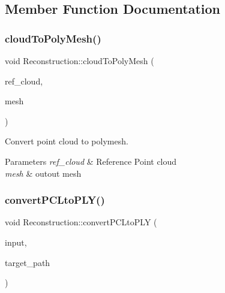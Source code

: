 \subsection{Member Function Documentation}
\mbox{\label{classReconstruction_a1b7f0942d1540ace69e53c28d3b82023}} 
\subsubsection{\texorpdfstring{cloud\+To\+Poly\+Mesh()}{cloudToPolyMesh()}}
{\footnotesize\ttfamily void Reconstruction\+::cloud\+To\+Poly\+Mesh (\begin{DoxyParamCaption}\item[{pcl\+::\+Point\+Cloud$<$ pcl\+::\+Point\+X\+Y\+Z\+R\+G\+B\+Normal $>$\+::Ptr \&}]{ref\+\_\+cloud,  }\item[{pcl\+::\+Polygon\+Mesh\+::\+Ptr \&}]{mesh }\end{DoxyParamCaption})}



Convert point cloud to polymesh. 


\begin{DoxyParams}{Parameters}
{\em ref\+\_\+cloud} & Reference Point cloud \\
\hline
{\em mesh} & outout mesh \\
\hline
\end{DoxyParams}
\mbox{\label{classReconstruction_aad287c118ab81ecf00c29f55314fc237}} 
\subsubsection{\texorpdfstring{convert\+P\+C\+Lto\+P\+L\+Y()}{convertPCLtoPLY()}}
{\footnotesize\ttfamily void Reconstruction\+::convert\+P\+C\+Lto\+P\+LY (\begin{DoxyParamCaption}\item[{pcl\+::\+Point\+Cloud$<$ pcl\+::\+Point\+X\+Y\+Z\+R\+G\+B\+Normal $>$\+::Ptr \&}]{input,  }\item[{std\+::string}]{target\+\_\+path }\end{DoxyParamCaption})}



